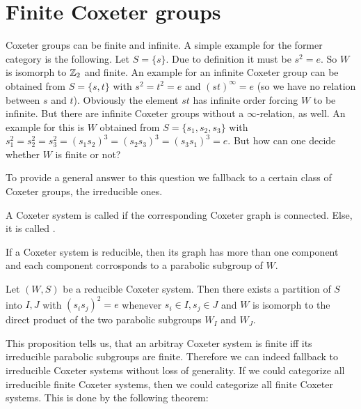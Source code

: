\section{Finite Coxeter groups}
\label{sec:coxeter-groups-finite}

Coxeter groups can be finite and infinite. A simple example for the former category is the following. Let $S = \{ s \}$. Due to definition it must be $s^2 = e$. So $W$ is isomorph to $\mathbb{Z}_2$ and finite. An example for an infinite Coxeter group can be obtained from $S = \{s,t\}$ with $s^2=t^2=e$ and $(st)^\infty = e$ (so we have no relation between $s$ and $t$). Obviously the element $st$ has infinite order forcing $W$ to be infinite. But there are infinite Coxeter groups without a $\infty$-relation, as well. An example for this is $W$ obtained from $S=\{s_1,s_2,s_3\}$ with $s_1^2=s_2^2=s_3^2=(s_1 s_2)^3=(s_2 s_3)^3=(s_3 s_1)^3=e$. But how can one decide whether $W$ is finite or not?

To provide a general answer to this question we fallback to a certain class of Coxeter groups, the irreducible ones.

\begin{defi}
	A Coxeter system is called  if the corresponding Coxeter graph is connected. Else, it is called .
\end{defi}

If a Coxeter system is reducible, then its graph has more than one component and each component corrosponds to a parabolic subgroup of $W$. 

\begin{prop}
	Let $(W,S)$ be a reducible Coxeter system. Then there exists a partition of $S$ into $I,J$ with $(s_i s_j)^2 = e$ whenever $s_i \in I, s_j \in J$ and $W$ is isomorph to the direct product of the two parabolic subgroups $W_I$ and $W_J$.
\end{prop}

This proposition tells us, that an arbitray Coxeter system is finite iff its irreducible parabolic subgroups are finite. Therefore we can indeed fallback to irreducible Coxeter systems without loss of generality. If we could categorize all irreducible finite Coxeter systems, then we could categorize all finite Coxeter systems. This is done by the following theorem:

